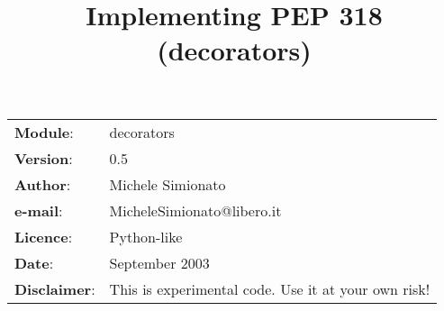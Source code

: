 \documentclass[11pt,english]{article}
\title{Implementing PEP 318 (decorators)}
\author{}
\date{}
\newlength{\docinfowidth}
\begin{document}
\maketitle

\begin{center}
\begin{tabularx}{\docinfowidth}{lX}
\textbf{Module}: &
	decorators \\
\textbf{Version}: &
	0.5 \\
\textbf{Author}: &
	Michele Simionato \\
\textbf{e-mail}: &
	MicheleSimionato@libero.it \\
\textbf{Licence}: &
	Python-like \\
\textbf{Date}: &
	September 2003 \\
\textbf{Disclaimer}: &
	This is experimental code. Use it at your own risk! \\
\end{tabularx}
\end{center}
\end{document}
